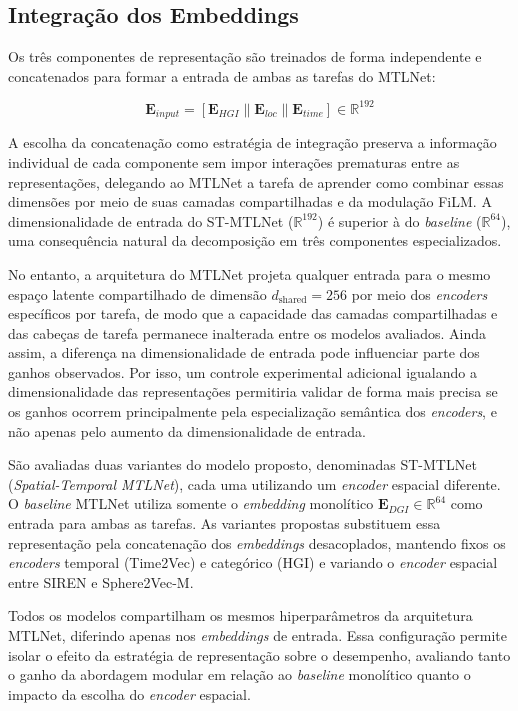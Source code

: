 \subsection{Integração dos Embeddings}

Os três componentes de representação são treinados de forma independente e concatenados para formar a entrada de ambas as tarefas do MTLNet:

\begin{equation}
\mathbf{E}_{input} = [\mathbf{E}_{HGI} \| \mathbf{E}_{loc} \| \mathbf{E}_{time}] \in \mathbb{R}^{192}
\label{eq:concat}
\end{equation}

A escolha da concatenação como estratégia de integração preserva a informação individual de cada componente sem impor interações prematuras entre as representações, delegando ao MTLNet a tarefa de aprender como combinar essas dimensões por meio de suas camadas compartilhadas e da modulação FiLM. A dimensionalidade de entrada do ST-MTLNet ($\mathbb{R}^{192}$) é superior à do \textit{baseline} ($\mathbb{R}^{64}$), uma consequência natural da decomposição em três componentes especializados. 

No entanto, a arquitetura do MTLNet projeta qualquer entrada para o mesmo espaço latente compartilhado de dimensão $d_{\mathrm{shared}} = 256$ por meio dos \textit{encoders} específicos por tarefa, de modo que a capacidade das camadas compartilhadas e das cabeças de tarefa permanece inalterada entre os modelos avaliados. Ainda assim, a diferença na dimensionalidade de entrada pode influenciar parte dos ganhos observados. Por isso, um controle experimental adicional igualando a dimensionalidade das representações permitiria validar de forma mais precisa se os ganhos ocorrem principalmente pela especialização semântica dos \textit{encoders}, e não apenas pelo aumento da dimensionalidade de entrada.

São avaliadas duas variantes do modelo proposto, denominadas ST-MTLNet (\textit{Spatial-Temporal MTLNet}), cada uma utilizando um \textit{encoder} espacial diferente. O \textit{baseline} MTLNet \cite{silva2025mtlnet} utiliza somente o \textit{embedding} monolítico $\mathbf{E}_{DGI} \in \mathbb{R}^{64}$ como entrada para ambas as tarefas. As variantes propostas substituem essa representação pela concatenação dos \textit{embeddings} desacoplados, mantendo fixos os \textit{encoders} temporal (Time2Vec) e categórico (HGI) e variando o \textit{encoder} espacial entre SIREN e Sphere2Vec-M.

Todos os modelos compartilham os mesmos hiperparâmetros da arquitetura MTLNet, diferindo apenas nos \textit{embeddings} de entrada. Essa configuração permite isolar o efeito da estratégia de representação sobre o desempenho, avaliando tanto o ganho da abordagem modular em relação ao \textit{baseline} monolítico quanto o impacto da escolha do \textit{encoder} espacial.
